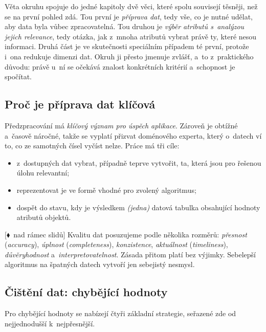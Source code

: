 \documentclass[11pt,a4paper]{article}
\theoremstyle{definition}
\newcommand{\mimo}{\textcolor{markcol}{\textsf{\footnotesize[$\blacklozenge$~nad rámec slidů]}}}
\begin{document}
Věta okruhu spojuje do jedné kapitoly dvě věci, které spolu souvisejí těsněji, než se na
první pohled zdá. Tou první je \emph{příprava dat}, tedy vše, co je nutné udělat, aby data
byla vůbec zpracovatelná. Tou druhou je \emph{výběr atributů s~analýzou jejich relevance},
tedy otázka, jak z~mnoha atributů vybrat právě ty, které nesou informaci. Druhá část je ve
skutečnosti speciálním případem té první, protože i~ona redukuje dimenzi dat. Okruh ji přesto
jmenuje zvlášť, a~to z~praktického důvodu: právě u~ní se očekává znalost konkrétních kritérií
a~schopnost je spočítat.

\subsection{Proč je příprava dat klíčová}

Předzpracování má \emph{klíčový význam pro úspěch aplikace}. Zároveň je obtížné a~časově
náročné, takže se vyplatí přizvat doménového experta, který o~datech ví to, co ze samotných
čísel vyčíst nelze. Práce má tři cíle:
\begin{itemize}
\item z~dostupných dat vybrat, případně teprve vytvořit, ta, která jsou pro řešenou úlohu
      relevantní;
\item reprezentovat je ve formě vhodné pro zvolený algoritmus;
\item dospět do stavu, kdy je výsledkem \emph{(jedna)} datová tabulka obsahující hodnoty
      atributů objektů.
\end{itemize}

\mimo{} Kvalitu dat posuzujeme podle několika rozměrů: \emph{přesnost} (\emph{accuracy}),
\emph{úplnost} (\emph{completeness}), \emph{konzistence}, \emph{aktuálnost}
(\emph{timeliness}), \emph{důvěryhodnost} a~\emph{interpretovatelnost}. Zásada  přitom platí bez výjimky. Sebelepší algoritmus na špatných datech vytvoří
jen sebejistý nesmysl.

\subsection{Čištění dat: chybějící hodnoty}

Pro chybějící hodnoty se nabízejí čtyři základní strategie, seřazené zde od nejjednodušší
k~nejpřesnější.
\end{document}
